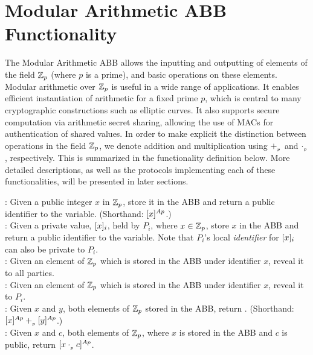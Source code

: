 \section{Modular Arithmetic ABB Functionality}

The Modular Arithmetic ABB allows the inputting and outputting of elements of the field $\mathbb{Z}_p$ (where $p$ is a prime), and basic operations on these elements.
Modular arithmetic over $\mathbb{Z}_p$ is useful in a wide range of applications. 
It enables efficient instantiation of arithmetic for a fixed prime $p$, which is central to many cryptographic constructions such as elliptic curves.
It also supports secure computation via arithmetic secret sharing, allowing the use of MACs for authentication of shared values.
In order to make explicit the distinction between operations in the field $\mathbb{Z}_p$, we denote addition and multiplication using $+_{_p}$ and $\cdot_{_p}$, respectively.
This is summarized in the functionality definition below.
More detailed descriptions, as well as the protocols implementing each of these functionalities, will be presented in later sections.

\begin{functionality}
	
	: Given a public integer $x$ in $\mathbb{Z}_p$, store it in the ABB and return a public identifier to the variable. 
	(Shorthand: $[x]^{Ap}$.)\\
	
	:  Given a private value, $[x]_{i}$, held by $P_i$, where $x \in \mathbb{Z}_p$,
	store $x$ in the ABB and return a public identifier to the variable. 
    Note that $P_i$'s local \emph{identifier} for $[x]_{i}$ can also be private to $P_i$. \\
	
	: Given an element of $\mathbb{Z}_p$ which is stored in the ABB under identifier $x$, reveal it to all parties. \\
	
	:  Given an element of $\mathbb{Z}_p$ which is stored in the ABB under identifier $x$, reveal it to $P_i$. \\
	
	: Given $x$ and $y$, both elements of $\mathbb{Z}_p$ stored in the ABB, return . (Shorthand: $[x]^{Ap} +_{_p} [y]^{Ap}$.) \\

    : Given $x$ and $c$, both elements of $\mathbb{Z}_p$, where $x$ is stored in the ABB and $c$ is public, return $[x \cdot_{_p} c]^{Ap}$. \\

\end{functionality}
